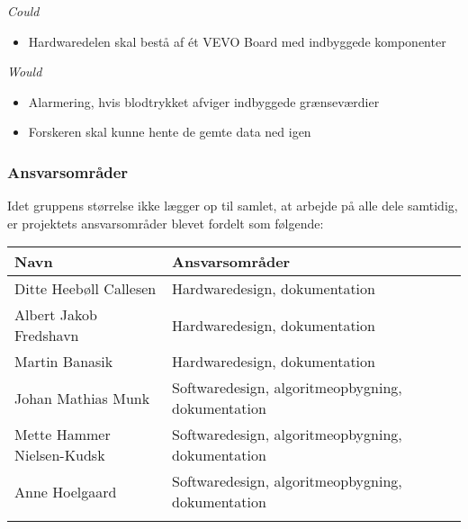 \textit{Could}
\begin{itemize}
\item Hardwaredelen skal bestå af ét VEVO Board med indbyggede komponenter

\end{itemize} 
\textit{Would}
\begin{itemize}
\item Alarmering, hvis blodtrykket afviger indbyggede grænseværdier
\item Forskeren skal kunne hente de gemte data ned igen
\end{itemize}

\subsubsection{Ansvarsområder}

Idet gruppens størrelse ikke lægger op til samlet, at arbejde på alle dele samtidig, er projektets ansvarsområder blevet fordelt som følgende:

\begin{longtabu} to 
    Navn &    Ansvarsområder &    \\[-1ex]
    \midrule
    Ditte Heebøll Callesen &   Hardwaredesign, dokumentation	&    \\
    Albert Jakob Fredshavn &   Hardwaredesign, dokumentation	&    \\
    Martin Banasik         &   Hardwaredesign, dokumentation	&    \\
    Johan Mathias Munk     &   Softwaredesign, algoritmeopbygning, dokumentation &    \\
    Mette Hammer Nielsen-Kudsk &   Softwaredesign, algoritmeopbygning, dokumentation &    \\
   	Anne Hoelgaard    &   Softwaredesign, algoritmeopbygning, dokumentation	&    \\
\label{version_Systemark}
\end{longtabu}